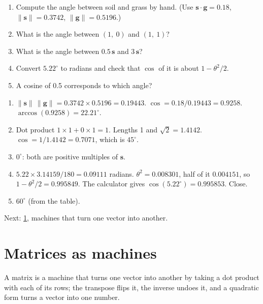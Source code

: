 \documentclass[11pt,a4paper,oneside,openany]{book}
\newcommand{\B}[1]{{\symbf{#1}}}
\newcommand{\B}[1]{{\bm{#1}}}
\newcommand{\nrm}[1]{\lVert #1\rVert}
\newcommand{\vg}{\B{g}}
\newcommand{\vs}{\B{s}}
\newcommand{\nextchapter}[1]{\par\medskip\noindent\hfill\textsf{\small Next: #1}\par}
\begin{document}
\begin{checkyourself}
\begin{enumerate}
\item Compute the angle between soil and grass by hand. (Use $\vs\cdot\vg=0.18$, $\nrm{\vs}=0.3742$, $\nrm{\vg}=0.5196$.)
\item What is the angle between $(1,\ 0)$ and $(1,\ 1)$?
\item What is the angle between $0.5\,\vs$ and $3\,\vs$?
\item Convert $5.22^\circ$ to radians and check that $\cos$ of it is about $1-\theta^2/2$.
\item A cosine of 0.5 corresponds to which angle?
\end{enumerate}
\end{checkyourself}

\begin{answers}
\begin{enumerate}
\item $\nrm{\vs}\,\nrm{\vg}=0.3742\times0.5196=0.19443$. $\cos=0.18/0.19443=0.9258$. $\arccos(0.9258)=22.21^\circ$.
\item Dot product $1\times1+0\times1=1$. Lengths 1 and $\sqrt2=1.4142$. $\cos=1/1.4142=0.7071$, which is $45^\circ$.
\item $0^\circ$: both are positive multiples of $\vs$.
\item $5.22\times3.14159/180=0.09111$ radians. $\theta^2=0.008301$, half of it $0.004151$, so $1-\theta^2/2=0.995849$. The
  calculator gives $\cos(5.22^\circ)=0.995853$. Close.
\item $60^\circ$ (from the table).
\end{enumerate}
\end{answers}

\nextchapter{\cref{ch:matrices}, machines that turn one vector into another.}
\chapter{Matrices as machines}
\label{ch:matrices}

\begin{onething}
A matrix is a machine that turns one vector into another by taking a dot product with each of its rows; the transpose
flips it, the inverse undoes it, and a quadratic form turns a vector into one number.
\end{onething}
\end{document}
